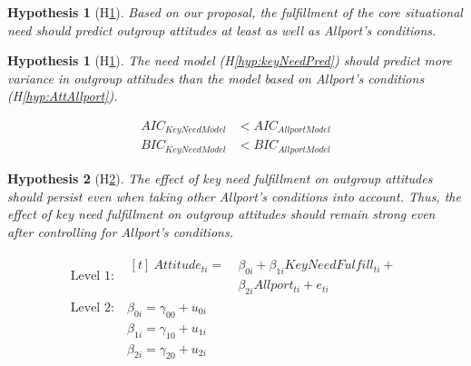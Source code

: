 \documentclass[man, 12pt, a4paper, mask]{apa7}
\theoremstyle{break}
\theoremstyle{plain}
\newtheorem{hyp}{Hypothesis}
\newtheorem{subhyp}{Hypothesis}
\begin{document}
\begin{mdframed}[style=mdfhypothesis]
    \begin{hyp}[H\ref{hyp:NeedAllport}] \label{hyp:NeedAllport}
    Based on our proposal, the fulfillment of the core situational need should predict outgroup attitudes at least as well as Allport's conditions.
    \end{hyp}

    \setcounter{subhyp}{0}
    \begin{subhyp}[H\ref{hyp:compModel}] \label{hyp:compModel}
    \addtolength{\leftskip}{\subhypskip}
    The need model (H\ref{hyp:keyNeedPred}) should predict more variance in outgroup attitudes than the model based on Allport's conditions (H\ref{hyp:AttAllport}).
    \end{subhyp}

    \begin{fleqn}[\eqskip] 
        \begin{equation}
            \begin{split}
                AIC_{KeyNeedModel} & < AIC_{AllportModel} \\
                BIC_{KeyNeedModel} & < BIC_{AllportModel}
            \end{split}
        \end{equation}
    \end{fleqn}

    \begin{subhyp}[H\ref{hyp:compTogether}] \label{hyp:compTogether}
    \addtolength{\leftskip}{\subhypskip}
    The  effect of key need fulfillment on outgroup attitudes should  persist even when taking other Allport's conditions into account. Thus, the effect of key need fulfillment on outgroup attitudes should remain strong even after controlling for Allport's conditions.  
    \end{subhyp} 
    
    \begin{fleqn}[\eqskip]
      \begin{equation} \label{eq:SlopesAttCoreAllport}
        \begin{split}
          \textrm{Level 1:} &
            \begin{aligned}[t]
              \ Attitude_{ti} =  &\ \beta_{0i} + \beta_{1i}KeyNeedFulfill_{ti} + \\
                                 &\ \beta_{2i}Allport_{ti} + e_{ti}
            \end{aligned} \\
          \textrm{Level 2:} &\ \beta_{0i} = \gamma_{00} + u_{0i} \\
                            &\ \beta_{1i} = \gamma_{10} + u_{1i} \\
                            &\ \beta_{2i} = \gamma_{20} + u_{2i}
        \end{split} 
      \end{equation}
    \end{fleqn}
\end{mdframed}
\end{document}
